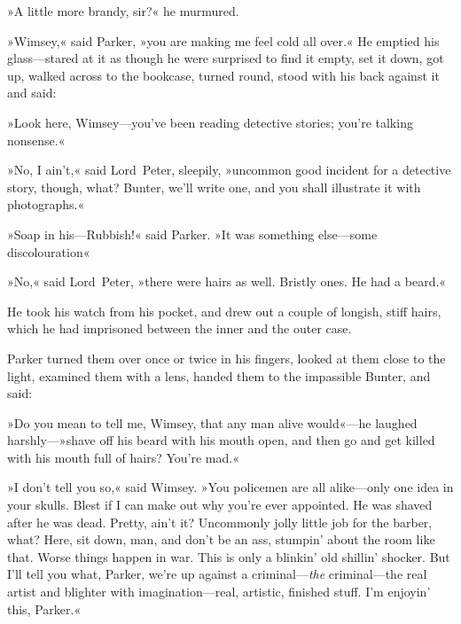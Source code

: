 »A little more brandy, sir?« he murmured.

»Wimsey,« said Parker, »you are making me feel cold all over.« He emptied his glass—stared at it as though he were surprised to find it empty, set it down, got up, walked across to the bookcase, turned round, stood with his back against it and said:

»Look here, Wimsey—you've been reading detective stories; you're talking nonsense.«

»No, I ain't,« said Lord~Peter, sleepily, »uncommon good incident for a detective story, though, what? Bunter, we'll write one, and you shall illustrate it with photographs.«

»Soap in his—Rubbish!« said Parker. »It was something else—some discolouration\longdash«

»No,« said Lord~Peter, »there were hairs as well. Bristly ones. He had a beard.«

He took his watch from his pocket, and drew out a couple of longish, stiff hairs, which he had imprisoned between the inner and the outer case.

Parker turned them over once or twice in his fingers, looked at them close to the light, examined them with a lens, handed them to the impassible Bunter, and said:

»Do you mean to tell me, Wimsey, that any man alive would«---he laughed harshly---»shave off his beard with his mouth open, and then go and get killed with his mouth full of hairs? You're mad.«

»I don't tell you so,« said Wimsey. »You policemen are all alike—only one idea in your skulls. Blest if I can make out why you're ever appointed. He was shaved after he was dead. Pretty, ain't it? Uncommonly jolly little job for the barber, what? Here, sit down, man, and don't be an ass, stumpin' about the room like that. Worse things happen in war. This is only a blinkin' old shillin' shocker. But I'll tell you what, Parker, we're up against a criminal---\textit{the} criminal—the real artist and blighter with imagination—real, artistic, finished stuff. I'm enjoyin' this, Parker.«